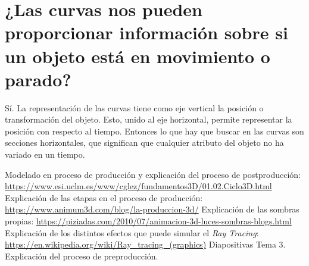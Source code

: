 \documentclass{article}
\begin{document}
\section{¿Las curvas nos pueden proporcionar información sobre si un objeto está en movimiento o parado?}


Sí. La representación de las curvas tiene como eje vertical la posición o transformación del objeto. Esto, unido al eje horizontal, permite representar la posición con respecto al tiempo. Entonces lo que hay que buscar en las curvas son secciones horizontales, que significan que cualquier atributo del objeto no ha variado en un tiempo.

\newpage

\begin{thebibliography}{1}
     Modelado en proceso de producción y explicación del proceso de postproducción: \url{https://www.esi.uclm.es/www/cglez/fundamentos3D/01.02.Ciclo3D.html}
     Explicación de las etapas en el proceso de producción: \url{https://www.animum3d.com/blog/la-produccion-3d/}
     Explicación de las sombras propias: \url{https://piziadas.com/2010/07/animacion-3d-luces-sombras-blogs.html}
     Explicación de los distintos efectos que puede simular el \textit{Ray Tracing}: \url{https://en.wikipedia.org/wiki/Ray_tracing_(graphics)}
     Diapositivas Tema 3. Explicación del proceso de preproducción.
\end{thebibliography}
\end{document}
